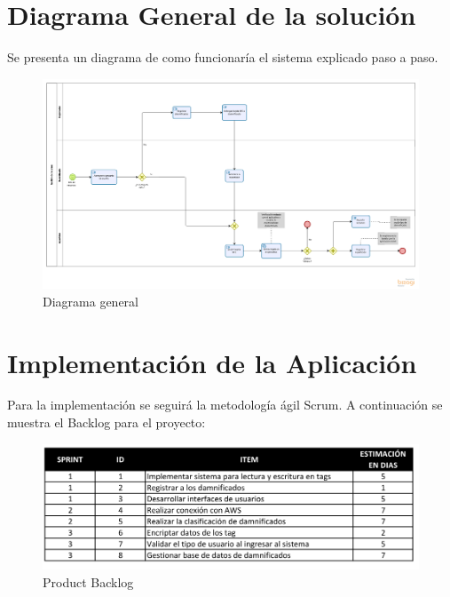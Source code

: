 \documentclass[11pt,openany]{book}
\begin{document}
	\section{Diagrama General de la solución }
	Se presenta un diagrama de como funcionaría el sistema explicado paso a paso.
	\begin{figure}[htbp]
			\centering
			\includegraphics[width=1.2\textwidth]{imagenes/Diagrama_general.png}
			\caption{Diagrama general}
			\label{Diagrama_general}
	\end{figure}

	\section{Implementación de la Aplicación}
	Para la implementación se seguirá la metodología ágil Scrum. A continuación se muestra el Backlog para el proyecto:
	\newpage
	\begin{figure}[htbp]
			\centering
			\includegraphics[width=1\textwidth]{imagenes/sprint.PNG}
			\caption{Product Backlog}
			\label{Product_Backlog}
	\end{figure}
	
	
	
\end{document}
